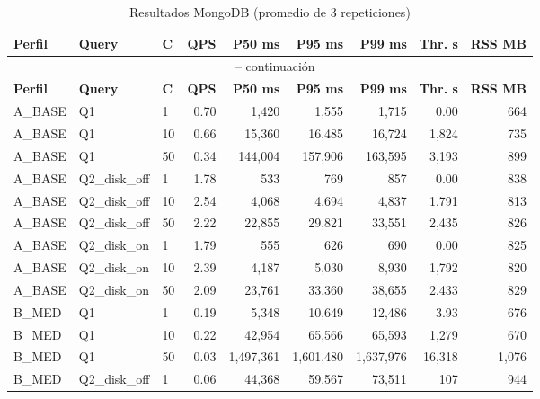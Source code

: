 \documentclass[12pt,a4paper]{article}
\begin{document}
\begin{longtable}{lllrrrrrr}
\caption{Resultados MongoDB (promedio de 3 repeticiones)} \label{tab:mongodb} \\
\toprule
\textbf{Perfil} & \textbf{Query} & \textbf{C} & \textbf{QPS} & \textbf{P50 ms} & \textbf{P95 ms} & \textbf{P99 ms} & \textbf{Thr. s} & \textbf{RSS MB} \\
\midrule
\endfirsthead
\multicolumn{9}{c}{\tablename\ \thetable{} -- continuación} \\
\toprule
\textbf{Perfil} & \textbf{Query} & \textbf{C} & \textbf{QPS} & \textbf{P50 ms} & \textbf{P95 ms} & \textbf{P99 ms} & \textbf{Thr. s} & \textbf{RSS MB} \\
\midrule
\endhead
\bottomrule
\endfoot
\rowcolor{gray!8}
A\_BASE & Q1            & 1  & 0.70 & 1{,}420   & 1{,}555   & 1{,}715   & 0.00     & 664 \\
\rowcolor{gray!8}
A\_BASE & Q1            & 10 & 0.66 & 15{,}360  & 16{,}485  & 16{,}724  & 1{,}824  & 735 \\
\rowcolor{gray!8}
A\_BASE & Q1            & 50 & 0.34 & 144{,}004 & 157{,}906 & 163{,}595 & 3{,}193  & 899 \\
A\_BASE & Q2\_disk\_off & 1  & 1.78 & 533       & 769       & 857       & 0.00     & 838 \\
A\_BASE & Q2\_disk\_off & 10 & 2.54 & 4{,}068   & 4{,}694   & 4{,}837   & 1{,}791  & 813 \\
A\_BASE & Q2\_disk\_off & 50 & 2.22 & 22{,}855  & 29{,}821  & 33{,}551  & 2{,}435  & 826 \\
A\_BASE & Q2\_disk\_on  & 1  & 1.79 & 555       & 626       & 690       & 0.00     & 825 \\
A\_BASE & Q2\_disk\_on  & 10 & 2.39 & 4{,}187   & 5{,}030   & 8{,}930   & 1{,}792  & 820 \\
A\_BASE & Q2\_disk\_on  & 50 & 2.09 & 23{,}761  & 33{,}360  & 38{,}655  & 2{,}433  & 829 \\
\midrule
\rowcolor{warnbg}
B\_MED  & Q1            & 1  & 0.19 & 5{,}348    & 10{,}649  & 12{,}486  & 3.93    & 676 \\
\rowcolor{warnbg}
B\_MED  & Q1            & 10 & 0.22 & 42{,}954   & 65{,}566  & 65{,}593  & 1{,}279 & 670 \\
\rowcolor{errbg}
B\_MED  & Q1            & 50 & 0.03 & 1{,}497{,}361 & 1{,}601{,}480 & 1{,}637{,}976 & 16{,}318 & 1{,}076 \\
\rowcolor{warnbg}
B\_MED  & Q2\_disk\_off & 1  & 0.06 & 44{,}368   & 59{,}567  & 73{,}511  & 107     & 944 \\

\end{longtable}
\end{document}
